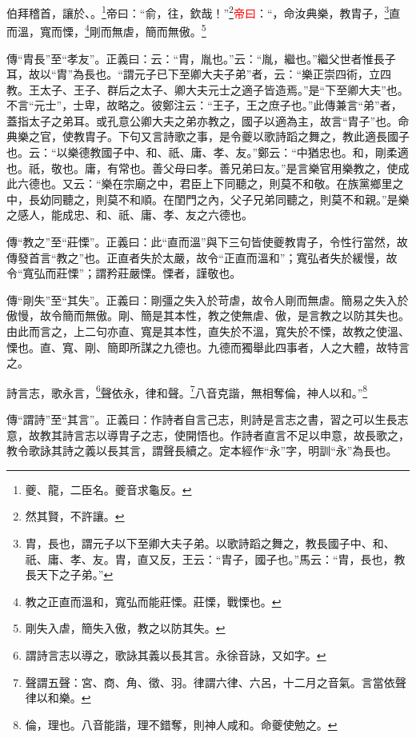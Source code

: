 伯拜稽首，讓於、。\footnote{夔、龍，二臣名。夔音求龜反。}帝曰：“俞，往，欽哉！”\footnote{然其賢，不許讓。}\textcolor{red}{帝曰}：“，命汝典樂，教胄子，\footnote{胄，長也，謂元子以下至卿大夫子弟。以歌詩蹈之舞之，教長國子中、和、祇、庸、孝、友。胄，直又反，王云：“胄子，國子也。”馬云：“胄，長也，教長天下之子弟。”}直而溫，寬而慄，\footnote{教之正直而溫和，寬弘而能莊慄。莊慄，戰慄也。}剛而無虐，簡而無傲。\footnote{剛失入虐，簡失入傲，教之以防其失。}

{\noindent\zhuan{}\fzbyks 傳“胄長”至“孝友”。正義曰：云：“胄，胤也。”云：“胤，繼也。”繼父世者惟長子耳，故以“胄”為長也。“謂元子已下至卿大夫子弟”者，云：“樂正崇四術，立四教。王太子、王子、群后之太子、卿大夫元士之適子皆造焉。”是“下至卿大夫”也。不言“元士”，士卑，故略之。彼鄭注云：“王子，王之庶子也。”此傳兼言“弟”者，蓋指太子之弟耳。或孔意公卿大夫之弟亦教之，國子以適為主，故言“胄子”也。命典樂之官，使教胄子。下句又言詩歌之事，是令夔以歌詩蹈之舞之，教此適長國子也。云：“以樂德教國子中、和、祇、庸、孝、友。”鄭云：“中猶忠也。和，剛柔適也。祇，敬也。庸，有常也。善父母曰孝。善兄弟曰友。”是言樂官用樂教之，使成此六德也。又云：“樂在宗廟之中，君臣上下同聽之，則莫不和敬。在族黨鄉里之中，長幼同聽之，則莫不和順。在閨門之內，父子兄弟同聽之，則莫不和親。”是樂之感人，能成忠、和、祇、庸、孝、友之六德也。 \par}

{\noindent\zhuan{}\fzbyks 傳“教之”至“莊慄”。正義曰：此“直而溫”與下三句皆使夔教胄子，令性行當然，故傳發首言“教之”也。正直者失於太嚴，故令“正直而溫和”；寬弘者失於緩慢，故令“寬弘而莊慄”；謂矜莊嚴慄。慄者，謹敬也。 \par}

{\noindent\zhuan{}\fzbyks 傳“剛失”至“其失”。正義曰：剛彊之失入於苛虐，故令人剛而無虐。簡易之失入於傲慢，故令簡而無傲。剛、簡是其本性，教之使無虐、傲，是言教之以防其失也。由此而言之，上二句亦直、寬是其本性，直失於不溫，寬失於不慄，故教之使溫、慄也。直、寬、剛、簡即所謀之九德也。九德而獨舉此四事者，人之大體，故特言之。 \par}

詩言志，歌永言，\footnote{謂詩言志以導之，歌詠其義以長其言。永徐音詠，又如字。}聲依永，律和聲。\footnote{聲謂五聲：宮、商、角、徵、羽。律謂六律、六呂，十二月之音氣。言當依聲律以和樂。}八音克諧，無相奪倫，神人以和。”\footnote{倫，理也。八音能諧，理不錯奪，則神人咸和。命夔使勉之。}

{\noindent\zhuan{}\fzbyks 傳“謂詩”至“其言”。正義曰：作詩者自言己志，則詩是言志之書，習之可以生長志意，故教其詩言志以導胄子之志，使開悟也。作詩者直言不足以申意，故長歌之，教令歌詠其詩之義以長其言，謂聲長續之。定本經作“永”字，明訓“永”為長也。 \par}

